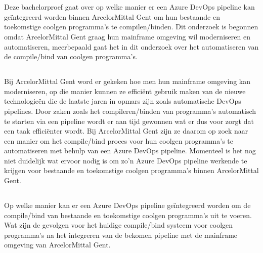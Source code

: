 
\chapter{}%
\label{ch:inleiding}

Deze bachelorproef gaat over op welke manier er een Azure DevOps pipeline kan geïntegreerd worden binnen ArcelorMittal Gent om hun bestaande en toekomstige coolgen programma's te compilen/binden. 
Dit onderzoek is begonnen omdat ArcelorMittal Gent graag hun mainframe omgeving wil moderniseren en automatiseren, meerbepaald gaat het in dit onderzoek over het automatiseren van de compile/bind van coolgen programma's.



\section{}%
\label{sec:probleemstelling}

Bij ArcelorMittal Gent word er gekeken hoe men hun mainframe omgeving kan moderniseren, op die manier kunnen ze efficiënt gebruik maken van de nieuwe technologieën die de laatste jaren in opmars zijn zoals automatische DevOps pipelines. 
Door zaken zoals het compileren/binden van programma's automatisch te starten via een pipeline wordt er aan tijd gewonnen wat er dus voor zorgt dat een taak efficiënter wordt. 
Bij ArcelorMittal Gent zijn ze daarom op zoek naar een manier om het compile/bind proces voor hun coolgen programma's te automatiseren met behulp van een Azure DevOps pipeline.
Momenteel is het nog niet duidelijk wat ervoor nodig is om zo'n Azure DevOps pipeline werkende te krijgen voor bestaande en toekomstige coolgen programma's binnen ArcelorMittal Gent.

\section{}%
\label{sec:onderzoeksvraag}

Op welke manier kan er een Azure DevOps pipeline geïntegreerd worden om de compile/bind van bestaande en toekomstige coolgen programma's uit te voeren. 
Wat zijn de gevolgen voor het huidige compile/bind systeem voor coolgen programma's na het integreren van de bekomen pipeline met de mainframe omgeving van ArcelorMittal Gent. 

